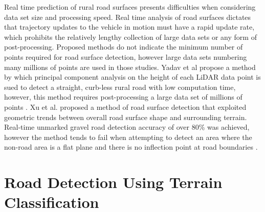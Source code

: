 \documentclass[numbered,pdftex]{ohio-etd}
\begin{document}
{{		{Real time prediction of rural road surfaces presents difficulties when considering data set size and processing speed. Real time analysis of road surfaces dictates that trajectory updates to the vehicle in motion must have a rapid update rate, which prohibits the relatively lengthy collection of large data sets or any form of post-processing. Proposed methods \cite{yadav_extraction_2017,yadav_road_2018,yadav_rural_2018,yadav_pole-shaped_2015,miyazaki_line-based_2014,yang_semi-automated_2013,liu_new_2013,qiu_fast_2016} do not indicate the minimum number of points required for road surface detection, however large data sets numbering many millions of points are used in those studies. Yadav et al \cite{yadav_road_2018} propose a method by which principal component analysis on the height of each LiDAR data point is sued to detect a straight, curb-less rural road with low computation time, however, this method requires post-processing a large data set of millions of points \cite{yadav_road_2018}. Xu et al. proposed a method of road surface detection that exploited geometric trends between overall road surface shape and surrounding terrain. Real-time unmarked gravel road detection accuracy of over 80\% was achieved, however the method tends to fail when attempting to detect an area where the non-road area is a flat plane and there is no inflection point at road boundaries \cite{xu_real-time_2019}. } 
					
	} %
	
%	
%	

	
	\section{Road Detection Using Terrain Classification}{
		
}}
\end{document}
